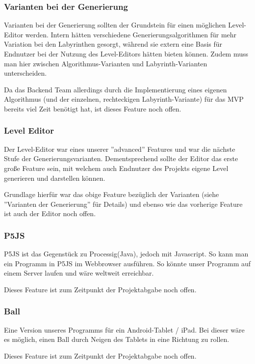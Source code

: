 	\subsubsection*{Varianten bei der Generierung}
		Varianten bei der Generierung sollten der Grundstein für einen möglichen Level-Editor werden. Intern hätten verschiedene Generierungsalgorithmen für mehr Variation bei den Labyrinthen gesorgt, während sie extern eine Basis für Endnutzer bei der Nutzung des Level-Editors hätten bieten können. Zudem muss man hier zwischen Algorithmus-Varianten und Labyrinth-Varianten unterscheiden.

		Da das Backend Team allerdings durch die Implementierung eines eigenen Algorithmus (und der einzelnen, rechteckigen Labyrinth-Variante) für das MVP bereits viel Zeit benötigt hat, ist dieses Feature noch offen.

	\subsubsection*{Level Editor}
		Der Level-Editor war eines unserer ''advanced'' Features und war die nächste Stufe der Generierungsvarianten. Dementsprechend sollte der Editor das erste große Feature sein, mit welchem auch Endnutzer des Projekts eigene Level generieren und darstellen können.

		Grundlage hierfür war das obige Feature bezüglich der Varianten (siehe ''Varianten der Generierung'' für Details) und ebenso wie das vorherige Feature ist auch der Editor noch offen.

	\subsubsection*{P5JS}
		P5JS ist das Gegenstück zu Processig(Java), jedoch mit Javascript. So kann man ein Programm in P5JS im Webbrowser ausführen. So könnte unser Programm auf einem Server laufen und wäre weltweit erreichbar.

		Dieses Feature ist zum Zeitpunkt der Projektabgabe noch offen.

	\subsubsection*{Ball}
		Eine Version unseres Programms für ein Android-Tablet / iPad. Bei dieser wäre es möglich, einen Ball durch Neigen des Tablets in eine Richtung zu rollen.

		Dieses Feature ist zum Zeitpunkt der Projektabgabe noch offen.

		
 
		
  
